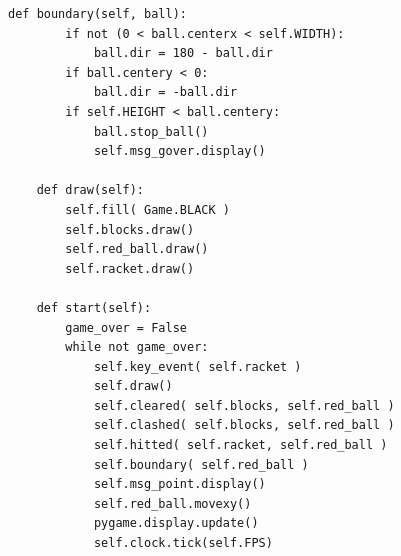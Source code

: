 \documentclass[uplatex,a4paper,11pt,oneside,openany]{jsbook}
\begin{document}
\begin{lstlisting}[caption=Gameクラス（Screenクラスを継承）,label=p2]
    def boundary(self, ball):
        if not (0 < ball.centerx < self.WIDTH):
            ball.dir = 180 - ball.dir
        if ball.centery < 0:
            ball.dir = -ball.dir
        if self.HEIGHT < ball.centery:
            ball.stop_ball()
            self.msg_gover.display()

    def draw(self):
        self.fill( Game.BLACK )
        self.blocks.draw()
        self.red_ball.draw()
        self.racket.draw()

    def start(self):
        game_over = False
        while not game_over:
            self.key_event( self.racket )
            self.draw()
            self.cleared( self.blocks, self.red_ball )
            self.clashed( self.blocks, self.red_ball )
            self.hitted( self.racket, self.red_ball )
            self.boundary( self.red_ball )
            self.msg_point.display()
            self.red_ball.movexy()
            pygame.display.update()
            self.clock.tick(self.FPS)
\end{lstlisting}

\newpage
\end{document}
